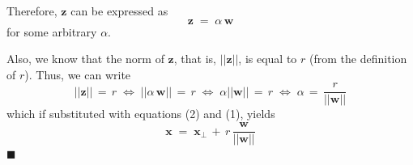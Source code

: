 \documentclass[12pt]{report}
\newcommand*{\QEDA}{\hfill\ensuremath{\blacksquare}}
\begin{document}
\begin{enumerate}
        Therefore, $\textbf{z}$ can be expressed as
        \begin{equation}
            \textbf{z} \;=\; \alpha \, \textbf{w}  
        \end{equation}
        for some arbitrary $\alpha$.

        Also, we know that the norm of $\textbf{z}$, that is, $||\textbf{z}||$, is equal to $r$ (from
        the definition of $r$). Thus, we can write
        $$||\textbf{z}|| \,=\, r \;\Leftrightarrow\; ||\alpha \, \textbf{w}|| \,=\, r \;\Leftrightarrow\;
          \alpha ||\textbf{w}|| \,=\, r \;\Leftrightarrow\; \alpha \,=\, \frac{r}{||\textbf{w}||}$$
        which if substituted with equations (2) and (1), yields
        $$\textbf{x} \;=\; \textbf{x}_{\perp} \,+\, r \, \frac{\textbf{w}}{||\textbf{w}||}$$ \QEDA
\end{enumerate}




\clearpage
\end{document}
